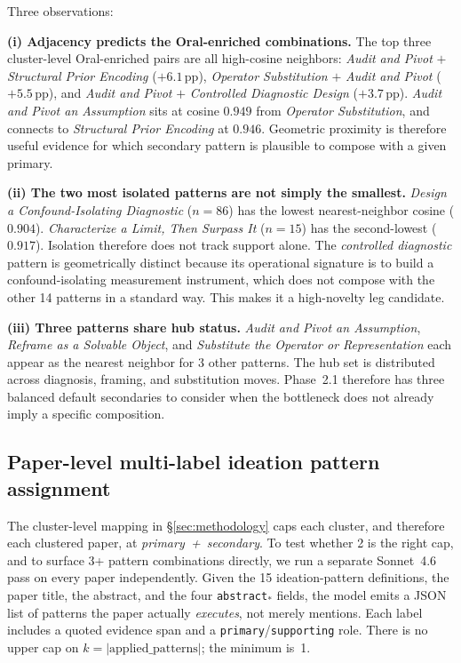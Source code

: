 \documentclass[10pt,a4paper]{article}
\begin{document}
Three observations:

\textbf{(i) Adjacency predicts the Oral-enriched combinations.} The top three cluster-level Oral-enriched pairs are all high-cosine neighbors: \emph{Audit and Pivot} $+$ \emph{Structural Prior Encoding} ($+6.1$\,pp), \emph{Operator Substitution} $+$ \emph{Audit and Pivot} ($+5.5$\,pp), and \emph{Audit and Pivot} $+$ \emph{Controlled Diagnostic Design} ($+3.7$\,pp). \emph{Audit and Pivot an Assumption} sits at cosine $0.949$ from \emph{Operator Substitution}, and connects to \emph{Structural Prior Encoding} at $0.946$. Geometric proximity is therefore useful evidence for which secondary pattern is plausible to compose with a given primary.

\textbf{(ii) The two most isolated patterns are not simply the smallest.} \emph{Design a Confound-Isolating Diagnostic} ($n{=}86$) has the lowest nearest-neighbor cosine ($0.904$). \emph{Characterize a Limit, Then Surpass It} ($n{=}15$) has the second-lowest ($0.917$). Isolation therefore does not track support alone. The \emph{controlled diagnostic} pattern is geometrically distinct because its operational signature is to build a confound-isolating measurement instrument, which does not compose with the other 14 patterns in a standard way. This makes it a high-novelty leg candidate.

\textbf{(iii) Three patterns share hub status.} \emph{Audit and Pivot an Assumption}, \emph{Reframe as a Solvable Object}, and \emph{Substitute the Operator or Representation} each appear as the nearest neighbor for 3 other patterns. The hub set is distributed across diagnosis, framing, and substitution moves. Phase~2.1 therefore has three balanced default secondaries to consider when the bottleneck does not already imply a specific composition.

\subsection{Paper-level multi-label ideation pattern assignment}
\label{subsec:multilabel}

The cluster-level mapping in \S\ref{sec:methodology} caps each cluster, and therefore each clustered paper, at \emph{primary~+~secondary}. To test whether 2 is the right cap, and to surface 3+ pattern combinations directly, we run a separate Sonnet~4.6 pass on every paper independently. Given the 15 ideation-pattern definitions, the paper title, the abstract, and the four \texttt{abstract}$_*$ fields, the model emits a JSON list of patterns the paper actually \emph{executes}, not merely mentions. Each label includes a quoted evidence span and a \texttt{primary}/\texttt{supporting} role. There is no upper cap on \(k = |\text{applied\_patterns}|\); the minimum is~1.
\end{document}
